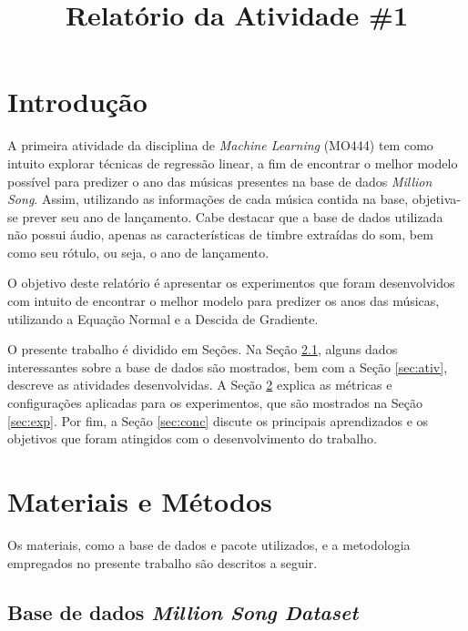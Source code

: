 \documentclass[conference]{IEEEtran}
\begin{document}
\title{Relatório da Atividade \#1}

\author{
\and
{}
}

\maketitle

\section{Introdução}

A primeira atividade da disciplina de \textit{Machine Learning} (MO444) tem como intuito explorar técnicas de regressão linear, a fim de encontrar o melhor modelo possível para predizer o ano das músicas presentes na base de dados \textit{Million Song}. Assim, utilizando as informações de cada música contida na base, objetiva-se prever seu ano de lançamento. Cabe destacar que a base de dados utilizada não possui áudio, apenas as características de timbre extraídas do som, bem como seu rótulo, ou seja, o ano de lançamento.

O objetivo deste relatório é apresentar os experimentos que foram desenvolvidos com intuito de encontrar o melhor modelo para predizer os anos das músicas, utilizando a Equação Normal e a Descida de Gradiente. 

O presente trabalho é dividido em Seções. Na Seção \ref{sec:base}, alguns dados interessantes sobre a base de dados são mostrados, bem com a Seção \ref{sec:ativ}, descreve as atividades desenvolvidas. A Seção \ref{sec:meto} explica as métricas e configurações aplicadas para os experimentos, que são mostrados na Seção \ref{sec:exp}. Por fim, a Seção \ref{sec:conc} discute os principais aprendizados e os objetivos que foram atingidos com o desenvolvimento do trabalho.

\section{Materiais e Métodos} \label{sec:meto}

Os materiais, como a base de dados e pacote utilizados, e a metodologia empregados no presente trabalho são descritos a seguir.

\subsection{Base de dados \textit{Million Song Dataset}} \label{sec:base}
\end{document}
